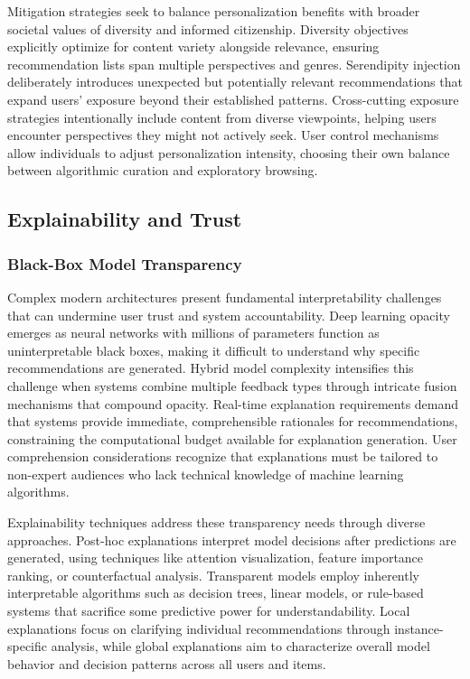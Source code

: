 Mitigation strategies seek to balance personalization benefits with broader societal values of diversity and informed citizenship. Diversity objectives explicitly optimize for content variety alongside relevance, ensuring recommendation lists span multiple perspectives and genres. Serendipity injection deliberately introduces unexpected but potentially relevant recommendations that expand users' exposure beyond their established patterns. Cross-cutting exposure strategies intentionally include content from diverse viewpoints, helping users encounter perspectives they might not actively seek. User control mechanisms allow individuals to adjust personalization intensity, choosing their own balance between algorithmic curation and exploratory browsing.

\subsection{Explainability and Trust}

\subsubsection{Black-Box Model Transparency}

Complex modern architectures present fundamental interpretability challenges that can undermine user trust and system accountability. Deep learning opacity emerges as neural networks with millions of parameters function as uninterpretable black boxes, making it difficult to understand why specific recommendations are generated. Hybrid model complexity intensifies this challenge when systems combine multiple feedback types through intricate fusion mechanisms that compound opacity. Real-time explanation requirements demand that systems provide immediate, comprehensible rationales for recommendations, constraining the computational budget available for explanation generation. User comprehension considerations recognize that explanations must be tailored to non-expert audiences who lack technical knowledge of machine learning algorithms.

Explainability techniques address these transparency needs through diverse approaches. Post-hoc explanations interpret model decisions after predictions are generated, using techniques like attention visualization, feature importance ranking, or counterfactual analysis. Transparent models employ inherently interpretable algorithms such as decision trees, linear models, or rule-based systems that sacrifice some predictive power for understandability. Local explanations focus on clarifying individual recommendations through instance-specific analysis, while global explanations aim to characterize overall model behavior and decision patterns across all users and items.

